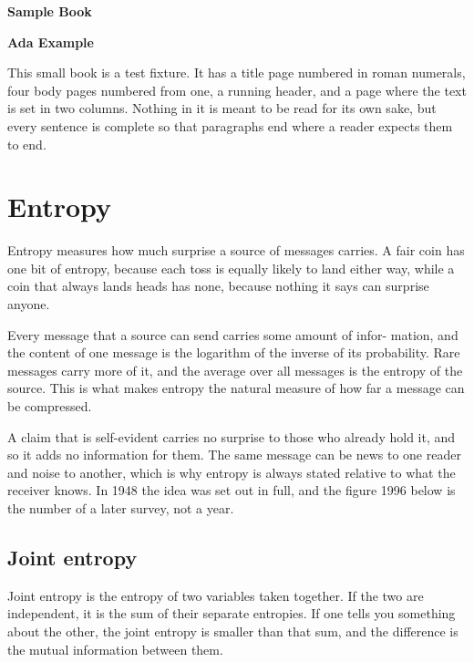 \documentclass[10pt]{article}
\begin{document}
\thispagestyle{empty}
\vspace*{6\baselineskip}
\begin{center}
{\huge\bfseries Sample Book\par}
\vspace{2\baselineskip}
{\large\bfseries Ada Example\par}
\end{center}
\vspace{4\baselineskip}

This small book is a test fixture. It has a title page numbered in roman
numerals, four body pages numbered from one, a running header, and a page
where the text is set in two columns. Nothing in it is meant to be read for
its own sake, but every sentence is complete so that paragraphs end where a
reader expects them to end.

\clearpage
{}

\section{Entropy}
Entropy measures how much surprise a source of messages carries. A fair coin
has one bit of entropy, because each toss is equally likely to land either
way, while a coin that always lands heads has none, because nothing it says
can surprise anyone.

Every message that a source can send carries some amount of infor-\linebreak
mation, and the content of one message is the logarithm of the inverse of its
probability. Rare messages carry more of it, and the average over all messages
is the entropy of the source. This is what makes entropy the natural measure
of how far a message can be compressed.

A claim that is self-evident carries no surprise to those who already hold
it, and so it adds no information for them. The same message can be news to
one reader and noise to another, which is why entropy is always stated
relative to what the receiver knows. In 1948 the idea was set out in full,
and the figure 1996 below is the number of a later survey, not a year.

\subsection{Joint entropy}
Joint entropy is the entropy of two variables taken together. If the two are
independent, it is the sum of their separate entropies. If one tells you
something about the other, the joint entropy is smaller than that sum, and
the difference is the mutual information between them.
\end{document}
